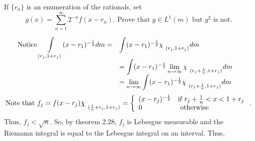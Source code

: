 \begin{enumerate}
If $\{r_n\}$ is an enumeration of the rationals, set 
\[
g(x)=\sum_{n=1}^\infty 2^{-n}f(x-r_n). \text{ Prove that } g \in L^1(m) \text{ but } g^2 \text{ is not.}
\] 	
\begin{pf}
\[\begin{array}{lll}
\text{Notice } \mathlarger{\int}\limits_{(r_j, 1+ r_j)}(x-r_1)^{-\frac{1}{2}}dm=&\mathlarger{\int} (x-r_1)^{-\frac{1}{2}} \mathlarger{\chi}_{\ _\mathlarger{(r_j, 1+ r_j)}}dm& \\
& = \mathlarger{\int} (x-r_1)^{-\frac{1}{2}} \lim\limits_{n \rightarrow \infty}\mathlarger{\chi}_{\ _\mathlarger{(r_j+ \frac{1}{n}, 1+ r_j)}}dm & \\
& = \lim\limits_{n \rightarrow \infty}\mathlarger{\int} (x-r_1)^{-\frac{1}{2}} \mathlarger{\chi}_{\ _\mathlarger{(r_j+ \frac{1}{n}, 1+ r_j)}}dm & \\
\end{array}
\]
\[
\text{Note that } f_j = f(x-r_j) \mathlarger{\chi}_{\ _\mathlarger{(\frac{1}{n}+r_j, 1+r_j)}}=\left\{
\begin{array}{ll}
(x-r_j)^{-\frac{1}{2}}& \text{if } r_j + \frac{1}{n} < x < 1+r_j\\
0 & \text{ otherwise} 	
\end{array}
\right.. 
\]	
Thus, $f_j < \sqrt{n}$. So, by theorem 2.28, $f_j$ is Lebesgue measurable and the Riemamn integral is equal to the Lebesgue integral on an interval. Thus,  


\end{pf}
\end{enumerate}
